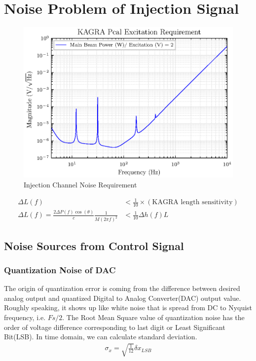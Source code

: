 \clearpage
\section{Noise Problem of Injection Signal}



\begin{figure}[hbt!]
\centering
\includegraphics[width=.9\textwidth]{figure/DAC_requirement.eps}
\caption{Injection Channel Noise Requirement}\label{fig:DAC_noise_requirement}
\end{figure}

\begin{align}
   \Delta L(f) &< \frac{1}{10} \times (\text{KAGRA length sensitivity})\\
   \Delta L(f) =\frac{2 \Delta P(f) \cos(\theta)}{c} \frac{1}{M(2 \pi f)^2} &< \frac{1}{10} \Delta h(f) L
\end{align}




\subsection{Noise Sources from Control Signal}
\subsubsection{Quantization Noise of DAC}


The origin of quantization error is coming from the difference between desired analog output and quantized Digital to Analog Converter(DAC) output value. Roughly speaking, it shows up like white noise that is spread from DC to Nyquist frequency, i.e. $Fs/2$.
The Root Mean Square value of quantization noise has the order of voltage difference corresponding to last digit or Least Significant Bit(LSB). In time domain, we can calculate standard deviation.
\begin{align}
   \sigma_x = \sqrt{\frac{1}{12}} \delta x_{LSB}
\end{align}

